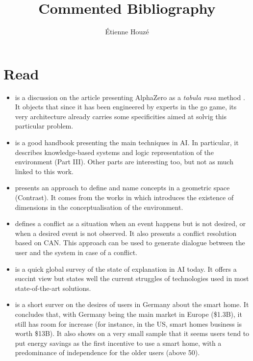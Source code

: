 \documentclass{article}
\title{Commented Bibliography}
\author{\'Etienne Houzé}
\date{}
\begin{document}
\maketitle
    \section{Read}
    \begin{itemize}
    \item \cite{marcus2018innateness} is a discussion on the article presenting AlphaZero as a \emph{tabula rasa} method \cite{silver2017mastering}. It objects that since it has been engineered by experts in the go game, its very architecture already carries some specificities aimed at solvig this particular problem.

    \item\cite{russell2016artificial} is a good handbook presenting the main techniques in AI. In particular, it describes knowledge-based systems and logic representation of the environment (Part III). Other parts are interesting too, but not as much linked to this work.

    \item\cite{dessalles2015conceptual}  presents an approach to define and name concepts in a geometric space (Contrast). It comes from the works in \cite{gardenfors2004conceptual} which introduces the existence of dimensions in the conceptualisation of the environment.

    \item\cite{dessalles2008computational} defines a conflict as a situation when an event happens but is not desired, or when a desired event is not observed. It also presents a conflict resolution based on CAN. This approach can be used to generate dialogue between the user and the system in case of a conflict.

    \item\cite{dovsilovic2018explainable} is a quick global survey of the state of explanation in AI today. It offers a succint view but states well the current struggles of technologies used in most state-of-the-art solutions.

    \item\cite{zimmermann2017user} is a short surver on the desires of users in Germany about the smart home. It concludes that, with Germany being the main market in Europe (\$1.3B), it still has room for increase (for instance, in the US, smart homes business is worth \$13B). It also shows on a very small sample that it seems users tend to put energy savings as the first incentive to use a smart home, with a predominance of independence for the older users (above 50).


\end{itemize}
\end{document}
